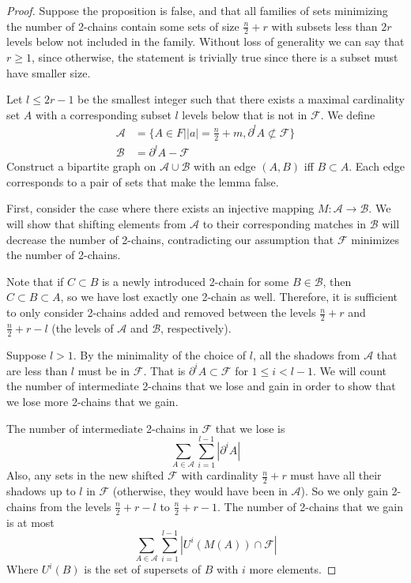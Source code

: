 \documentclass[12pt]{article}
\theoremstyle{plain}
\theoremstyle{definition}
\theoremstyle{remark}
\newcommand{\F}{\mathcal{F}}
\newcommand{\A}{\mathcal{A}}
\newcommand{\B}{\mathcal{B}}
\begin{document}
\begin{proof} Suppose the proposition is false, and that all families of sets minimizing the number of 2-chains contain some sets of size $\frac{n}{2} + r$ with subsets less than $2r$ levels below not included in the family. Without loss of generality we can say that $r \geq 1$, since otherwise, the statement is trivially true since there is a subset must have smaller size. 

Let $l \leq 2r-1$ be the smallest integer such that there exists a maximal cardinality set $A$ with a corresponding subset $l$ levels below that is not in $\F$. We define
\begin{align*}
\A &= \{A \in F| \lvert a \rvert = \frac{n}{2}+m, \partial^l A \not\subset \F \}\\
\B &= \partial^l A - \F
\end{align*}
Construct a bipartite graph on $\A \cup \B$ with an edge $(A,B)$ iff $B \subset A$. Each edge corresponds to a pair of sets that make the lemma false.

First, consider the case where there exists an injective mapping $M: \A \to \B$. We will show that shifting elements from $\A$ to their corresponding matches in $\B$ will decrease the number of 2-chains, contradicting our assumption that $\F$ minimizes the number of 2-chains.

Note that if $C \subset B$ is a newly introduced 2-chain for some $B \in \B$, then $C \subset B \subset A$, so we have lost exactly one 2-chain as well. Therefore, it is sufficient to only consider 2-chains added and removed between the levels $\frac{n}{2} + r$ and $\frac{n}{2} + r - l$ (the levels of $\A$ and $\B$, respectively).

Suppose $l > 1$. By the minimality of the choice of $l$, all the shadows from $\A$ that are less than $l$ must be in $\F$. That is $\partial^i A \subset \F$ for $1 \leq i < l -1$. We will count the number of intermediate 2-chains that we lose and gain in order to show that we lose more 2-chains that we gain.

The number of intermediate 2-chains in $\F$ that we lose is
\[ \sum_{A \in \A}\sum_{i = 1}^{l-1} |\partial^i A | \]
Also, any sets in the new shifted $\F$ with cardinality $\frac{n}{2} + r$ must have all their shadows up to $l$ in $\F$ (otherwise, they would have been in $\A$). So we only gain 2-chains from the levels $\frac{n}{2} + r - l$ to $\frac{n}{2} + r - 1$. The number of 2-chains that we gain is at most
\[\sum_{A\in \A}\sum_{i = 1}^{l-1} |U^i(M(A)) \cap \F| \]
Where $U^i(B)$ is the set of supersets of $B$ with $i$ more elements.


\end{proof}
\end{document}
